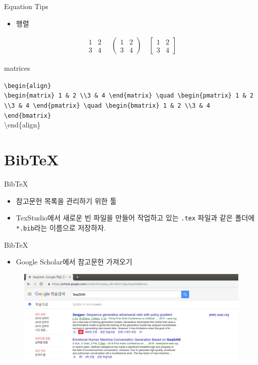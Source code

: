 \documentclass[12pt]{gshs_lecture}
\newcommand{\tb}{\textbackslash}
\newenvironment{codeblock}[1]{
	\begin{block}{#1}
		\setstretch{1.0}
		\begin{small}
}{
		\end{small}
	\end{block}
}
\begin{document}
\begin{frame}[t]{Equation Tips}
	\begin{itemize}
		\item 행렬
	\end{itemize}
	\begin{align}
	\begin{matrix}
	1 & 2 \\ 3 & 4
	\end{matrix} \quad
	\begin{pmatrix}
	1 & 2 \\ 3 & 4
	\end{pmatrix} \quad 
	\begin{bmatrix}
	1 & 2 \\ 3 & 4
	\end{bmatrix}
	\end{align}
	\begin{codeblock}{matrices}
		\texttt{\tb begin\{align\} \\
		\tb begin\{matrix\}
		1 \& 2 \tb \tb 3 \& 4
		\tb end\{matrix\} \tb quad
		\tb begin\{pmatrix\}
		1 \& 2 \tb \tb 3 \& 4
		\tb end\{pmatrix\} \tb quad 
		\tb begin\{bmatrix\}
		1 \& 2 \tb \tb 3 \& 4
		\tb end\{bmatrix\}} \\
		\tb end\{align\}
	\end{codeblock}
\end{frame}

\section{BibTeX}

\begin{frame}[t]{BibTeX}
	\begin{itemize}
		\item 참고문헌 목록을 관리하기 위한 툴
		\item TexStudio에서 새로운 빈 파일을 만들어 작업하고 있는 \texttt{.tex} 파일과 같은 폴더에 \texttt{*.bib}라는 이름으로 저장하자.
	\end{itemize}
\end{frame}

\begin{frame}[t]{BibTeX}
	\begin{itemize}
		\item Google Scholar에서 참고문헌 가져오기
	\end{itemize}
	\begin{figure}
	\centering
	\includegraphics[width=\textwidth]{pictures/scholar1.png}
	\end{figure}
\end{frame}
\end{document}
